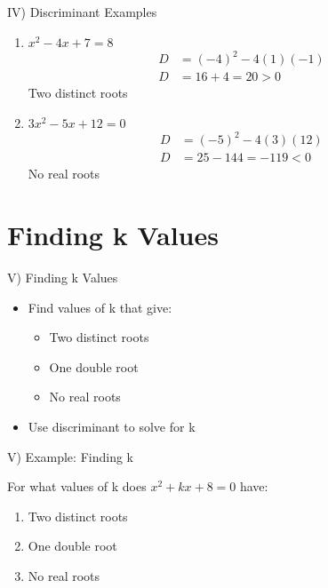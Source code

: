 \documentclass[aspectratio=169]{beamer}
\begin{document}
\begin{frame}{IV) Discriminant Examples}
    \begin{tcolorbox}[colback=lightgray,colframe=primary,title=Examples]
        \footnotesize
        \begin{enumerate}
            \item $x^2-4x+7=8$
            \begin{align*}
                D &= (-4)^2-4(1)(-1)\\
                D &= 16+4 = 20 > 0
            \end{align*}
            Two distinct roots
            
            \item $3x^2-5x+12=0$
            \begin{align*}
                D &= (-5)^2-4(3)(12)\\
                D &= 25-144 = -119 < 0
            \end{align*}
            No real roots
        \end{enumerate}
    \end{tcolorbox}
\end{frame}

\section{Finding k Values}

\begin{frame}{V) Finding k Values}
    \begin{tcolorbox}[colback=lightgray,colframe=primary,title=Problem Type]
        \footnotesize
        \begin{itemize}
            \item Find values of k that give:
            \begin{itemize}
                \item Two distinct roots
                \item One double root
                \item No real roots
            \end{itemize}
            \item Use discriminant to solve for k
        \end{itemize}
    \end{tcolorbox}
\end{frame}

\begin{frame}{V) Example: Finding k}
    \begin{tcolorbox}[colback=lightgray,colframe=primary,title=Example]
        \footnotesize
        For what values of k does $x^2+kx+8=0$ have:
        \begin{enumerate}
            \item Two distinct roots
            \item One double root
            \item No real roots
        \end{enumerate}
    \end{tcolorbox}
\end{frame}
\end{document}
